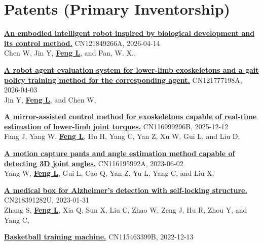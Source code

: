 \documentclass[a4paper,11pt]{article}
\begin{document}
\section{\textbf{Patents (Primary Inventorship)}}
\small
\begin{enumerate}[leftmargin=*, labelsep=0.5em, align=left, itemindent=0em, label={[\arabic*]}]
\item \href{https://kns.cnki.net/kcms2/article/abstract?v=BKa2HtjuZGEfellkQ1dXsK3HA_x8YxaUu6cioYZT_jUXjaczuZ9vx2zOwWTfsDokw82vWwBoDtEx26m6KUH3ziz7UpEPU-Hx2LlpmIC4XEDB0RGcvgvm8zxs0vfXCcFEt7fq0WxF8iF1zF_mG8sOIo1pclf8qSA-HcL_j2BQOPXbsSBNNvCCxg==\&uniplatform=NZKPT\&language=CHS}{\textbf{An embodied intelligent robot inspired by biological development and its control method.}} CN121849266A, 2026-04-14\\
Chen W, Jin Y, \underline{\textbf{Feng L}}, and Pan, W. X.,
\item \href{https://kns.cnki.net/kcms2/article/abstract?v=BKa2HtjuZGESLCZ5HcjHs9p_1OSQQK7Nn0_XxuBkrcliCEkdjviqlthQYZNd5pvJ_LR5Llo0tJ9W00Uug7iWeT9l7RXWMpPXf_90zm29myRCwylxkeCzuT4KH-bsDk-HD3GeGfzGsc3lDtumbSl-JyB0tuKUqrU2CNpqAyw4gA34eyy9yi5DvA==\&uniplatform=NZKPT\&language=CHS}{\textbf{A robot agent evaluation system for lower-limb exoskeletons and a gait policy training method for the corresponding agent.}} CN121777198A, 2026-04-03\\
Jin Y, \underline{\textbf{Feng L}}, and Chen W,
\item \href{https://patents.google.com/patent/CN116999296B}{\textbf{A mirror-assisted control method for exoskeletons capable of real-time estimation of lower-limb joint torques.}} CN116999296B, 2025-12-12\\
Fang J, Yang W, \underline{\textbf{Feng L}}, Hu H, Yang C, Yan Z, Xu W, Gui L, and Liu D,
\item \href{https://patents.google.com/patent/CN116195992A}{\textbf{A motion capture pants and angle estimation method capable of detecting 3D joint angles.}} CN116195992A, 2023-06-02\\
Yang W, \underline{\textbf{Feng L}}, Gui L, Cao Q, Yan Z, Yu L, Yang C, and Liu X,
\item \href{https://patents.google.com/patent/CN218391282U}{\textbf{A medical box for Alzheimer's detection with self-locking structure.}} CN218391282U, 2023-01-31\\
Zhang S, \underline{\textbf{Feng L}}, Xia Q, Sun X, Liu C, Zhao W, Zeng J, Hu R, Zhou Y, and Yang C,
\item \href{https://patents.google.com/patent/CN115463399B}{\textbf{Basketball training machine.}} CN115463399B, 2022-12-13\\

\end{enumerate}
\end{document}
